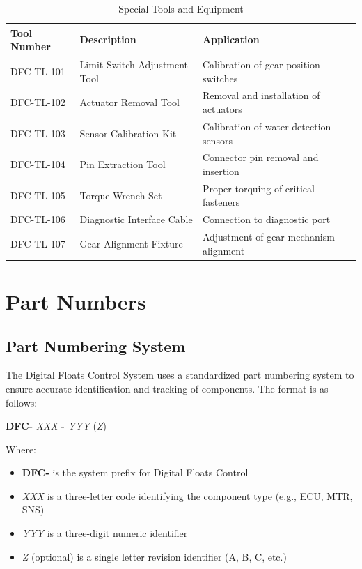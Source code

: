 \documentclass[12pt,a4paper,twoside,openright]{book}
\newcommand{\tabletextfont}{\normalfont\rmfamily}
\newcommand{\tableheadfont}{\normalfont\bfseries}
\begin{document}
\begin{table}[h]
\centering
\setlength{\tabcolsep}{5pt} %
\begin{tabular}{|p{}|p{}|p{}|}
\hline
\tableheadfont\textbf{Tool Number} & \tableheadfont\textbf{Description} & \tableheadfont\textbf{Application} \\
\hline
\tabletextfont DFC-TL-101 & Limit Switch Adjustment Tool & Calibration of gear position switches \\
\hline
\tabletextfont DFC-TL-102 & Actuator Removal Tool & Removal and installation of actuators \\
\hline
\tabletextfont DFC-TL-103 & Sensor Calibration Kit & Calibration of water detection sensors \\
\hline
\tabletextfont DFC-TL-104 & Pin Extraction Tool & Connector pin removal and insertion \\
\hline
\tabletextfont DFC-TL-105 & Torque Wrench Set & Proper torquing of critical fasteners \\
\hline
\tabletextfont DFC-TL-106 & Diagnostic Interface Cable & Connection to diagnostic port \\
\hline
\tabletextfont DFC-TL-107 & Gear Alignment Fixture & Adjustment of gear mechanism alignment \\
\hline
\end{tabular}
\caption{Special Tools and Equipment}
\end{table}

\section{Part Numbers}

\subsection{Part Numbering System}

The Digital Floats Control System uses a standardized part numbering system to ensure accurate identification and tracking of components. The format is as follows:

\begin{center}
\textbf{DFC-} \textit{XXX} \textbf{-} \textit{YYY} (\textit{Z})
\end{center}

Where:
\begin{itemize}
    \item \textbf{DFC-} is the system prefix for Digital Floats Control
    \item \textit{XXX} is a three-letter code identifying the component type (e.g., ECU, MTR, SNS)
    \item \textit{YYY} is a three-digit numeric identifier
    \item \textit{Z} (optional) is a single letter revision identifier (A, B, C, etc.)
\end{itemize}
\end{document}
